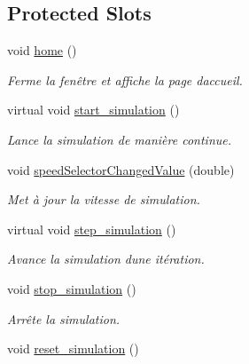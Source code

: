 \subsection*{Protected Slots}
\begin{DoxyCompactItemize}
\item 
\mbox{\label{class_simulator_interface_ac5ae23ad235fd533d9d4f457babb2ddd}} 
void \mbox{\hyperlink{class_simulator_interface_ac5ae23ad235fd533d9d4f457babb2ddd}{home}} ()
\begin{DoxyCompactList}\small\item\em Ferme la fenêtre et affiche la page d\textquotesingle{}accueil. \end{DoxyCompactList}\item 
virtual void \mbox{\hyperlink{class_simulator_interface_a1c0622490decde07945746cebf89f3c0}{start\+\_\+simulation}} ()
\begin{DoxyCompactList}\small\item\em Lance la simulation de manière continue. \end{DoxyCompactList}\item 
void \mbox{\hyperlink{class_simulator_interface_aceb8d6280ea17cd906969841e8283153}{speed\+Selector\+Changed\+Value}} (double)
\begin{DoxyCompactList}\small\item\em Met à jour la vitesse de simulation. \end{DoxyCompactList}\item 
virtual void \mbox{\hyperlink{class_simulator_interface_a38720a4d5e818b654313518eacc6e588}{step\+\_\+simulation}} ()
\begin{DoxyCompactList}\small\item\em Avance la simulation d\textquotesingle{}une itération. \end{DoxyCompactList}\item 
void \mbox{\hyperlink{class_simulator_interface_ad0afe7ccac9e1dd4f979e513065136d0}{stop\+\_\+simulation}} ()
\begin{DoxyCompactList}\small\item\em Arrête la simulation. \end{DoxyCompactList}\item 
\mbox{\label{class_simulator_interface_af633cc2cea96d692f9a6ce750927daa1}} 
void \mbox{\hyperlink{class_simulator_interface_af633cc2cea96d692f9a6ce750927daa1}{reset\+\_\+simulation}} ()

\end{DoxyCompactItemize}
